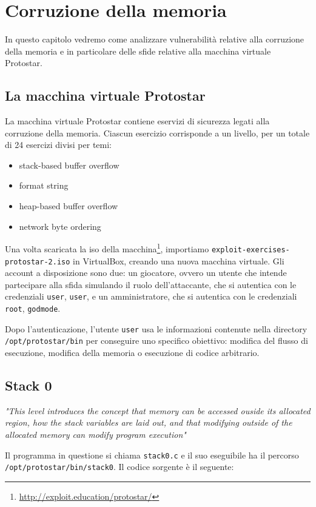\chapter{Corruzione della memoria}
In questo capitolo vedremo come analizzare vulnerabilità relative alla corruzione della memoria e in particolare delle sfide relative alla macchina virtuale Protostar.

\section{La macchina virtuale Protostar}
La macchina virtuale Protostar contiene eservizi di sicurezza legati alla corruzione della memoria. Ciascun esercizio corrisponde a un livello, per un totale di 24 esercizi divisi per temi:
\begin{itemize}
    \item stack-based buffer overflow
    \item format string
    \item heap-based buffer overflow
    \item network byte ordering
\end{itemize}
Una volta scaricata la iso della macchina\footnote{\href{http://exploit.education/protostar/}{http://exploit.education/protostar/}}, importiamo \texttt{exploit-exercises-protostar-2.iso} in VirtualBox, creando una nuova macchina virtuale. Gli account a disposizione sono due: un giocatore, ovvero un utente che intende partecipare alla sfida simulando il ruolo dell'attaccante, che si autentica con le credenziali \texttt{user}, \texttt{user}, e un amministratore, che si autentica con le credenziali \texttt{root}, \texttt{godmode}.

Dopo l'autenticazione, l'utente \texttt{user} usa le informazioni contenute nella directory \texttt{/opt/protostar/bin} per conseguire uno specifico obiettivo: modifica del flusso di esecuzione, modifica della memoria o esecuzione di codice arbitrario.

\section{Stack 0}
\textit{"This level introduces the concept that
memory can be accessed ouside its allocated
region, how the stack variables are laid out,
and that modifying outside of the allocated
memory can modify program execution"}

Il programma in questione si chiama \texttt{stack0.c} e il suo eseguibile ha il percorso \texttt{/opt/protostar/bin/stack0}. Il codice sorgente è il seguente:

